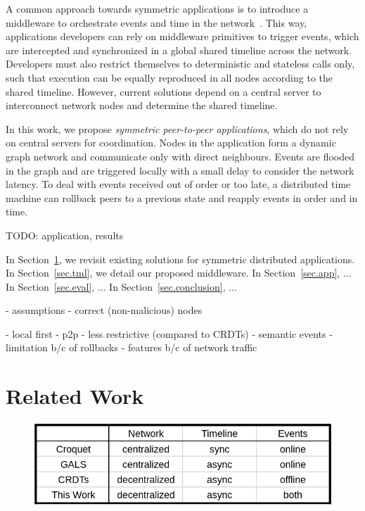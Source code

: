 \documentclass[10pt,journal,compsoc]{IEEEtran}
\begin{document}
A common approach towards symmetric applications is to introduce a middleware
to orchestrate events and time in the network~\cite{gals,croquet}.
This way, applications developers can rely on middleware primitives to trigger
events, which are intercepted and synchronized in a global shared timeline
across the network.
Developers must also restrict themselves to deterministic and stateless calls
only, such that execution can be equally reproduced in all nodes according to
the shared timeline.
However, current solutions depend on a central server to interconnect network
nodes and determine the shared timeline.

In this work, we propose \emph{symmetric peer-to-peer applications}, which
do not rely on central servers for coordination.
Nodes in the application form a dynamic graph network and communicate only
with direct neighbours.
Events are flooded in the graph and are triggered locally with a small delay
to consider the network latency.
To deal with events received out of order or too late, a distributed time
machine can rollback peers to a previous state and reapply events in order and
in time.

TODO: application, results

In Section~\ref{sec.related}, we revisit existing solutions for symmetric
distributed applications.
In Section~\ref{sec.tml}, we detail our proposed middleware.
In Section~\ref{sec.app}, ...
In Section~\ref{sec.eval}, ...
In Section~\ref{sec.conclusion}, ...

- assumptions
    - correct (non-malicious) nodes

- local first
- p2p
- less restrictive (compared to CRDTs)
- semantic events
    - limitation b/c of rollbacks
    - features b/c of network traffic

\section{Related Work}
\label{sec.related}

\begin{figure}[t]
  \centering
  \includegraphics[width=\linewidth]{table}
  \caption{
    \label{fig.table}
  }
\end{figure}
\end{document}
